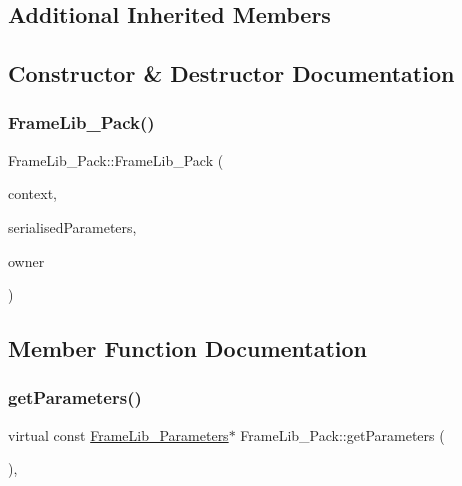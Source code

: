 \subsection*{Additional Inherited Members}


\subsection{Constructor \& Destructor Documentation}
\mbox{\label{class_frame_lib___pack_aded2a9815261f73a8231f5df6c647ac2}} 
\subsubsection{\texorpdfstring{Frame\+Lib\+\_\+\+Pack()}{FrameLib\_Pack()}}
{\footnotesize\ttfamily Frame\+Lib\+\_\+\+Pack\+::\+Frame\+Lib\+\_\+\+Pack (\begin{DoxyParamCaption}\item[{\hyperlink{class_frame_lib___context}{Frame\+Lib\+\_\+\+Context}}]{context,  }\item[{\hyperlink{class_frame_lib___parameters_1_1_serial}{Frame\+Lib\+\_\+\+Parameters\+::\+Serial} $\ast$}]{serialised\+Parameters,  }\item[{void $\ast$}]{owner }\end{DoxyParamCaption})}



\subsection{Member Function Documentation}
\mbox{\label{class_frame_lib___pack_a878bce4df2ece362d86cd03f742bc646}} 
\subsubsection{\texorpdfstring{get\+Parameters()}{getParameters()}}
{\footnotesize\ttfamily virtual const \hyperlink{class_frame_lib___parameters}{Frame\+Lib\+\_\+\+Parameters}$\ast$ Frame\+Lib\+\_\+\+Pack\+::get\+Parameters (\begin{DoxyParamCaption}{ }\end{DoxyParamCaption})\hspace{0.3cm}{\ttfamily [inline]}, {\ttfamily [virtual]}}



